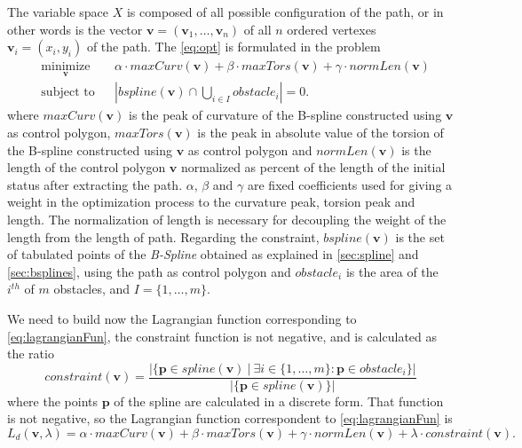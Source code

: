 \documentclass[dissertation.tex]{subfiles}
\begin{document}
The variable space $X$ is composed of all possible
configuration of the path, or in other words is the vector
$\mathbf{v}=(\mathbf{v}_1,\dots,\mathbf{v}_n)$ of all $n$ ordered
vertexes $\mathbf{v}_i=(x_i,y_i)$ of the
path. The \cref{eq:opt} is formulated in the problem
\begin{equation*}
  \begin{aligned}
    & \underset{\mathbf{v}}{\text{minimize}}
    & & \alpha\cdot maxCurv(\mathbf{v})+\beta\cdot
    maxTors(\mathbf{v})+\gamma\cdot normLen(\mathbf{v}) \\
    & \text{subject to}
    & & \left|bspline(\mathbf{v})\cap \bigcup_{i\in I}obstacle_i\right| = 0.
  \end{aligned}
\end{equation*}
where $maxCurv(\mathbf{v})$ is the peak of curvature of the B-spline
constructed using $\mathbf{v}$ as control polygon,
$maxTors(\mathbf{v})$ is the peak in absolute value of the torsion of
the B-spline constructed using $\mathbf{v}$ as control polygon and
$normLen(\mathbf{v})$ is the length of the control polygon
$\mathbf{v}$ normalized as percent of the length of the initial status
after extracting the path. $\alpha$, $\beta$ and $\gamma$ are fixed
coefficients used for giving a weight in the optimization process to
the curvature peak, torsion peak and length. The normalization of
length is necessary for decoupling the weight of the length from the
length of path. Regarding the constraint, $bspline(\mathbf{v})$
is the set of tabulated points of the \emph{B-Spline} obtained as
explained in
\cref{sec:spline} and \cref{sec:bsplines}, using the path as
control polygon and
$obstacle_i$ is the area of the $i^{th}$ of $m$ obstacles, and
$I=\{1,\dots,m\}$.

We need to build now the Lagrangian function corresponding to
\cref{eq:lagrangianFun}, the constraint function is not negative, and is calculated as the
ratio
\begin{equation*}
constraint(\mathbf{v}) = \frac{|\{\mathbf{p} \in spline(\mathbf{v})\ |\ \exists i\in\{1,\dots,m\}
  : \mathbf{p}\in obstacle_i \}|}{|\{\mathbf{p} \in spline(\mathbf{v})\}|}
\end{equation*}
where the points $\mathbf{p}$ of the spline are calculated in a discrete form. That
function is not negative, so the Lagrangian function correspondent to
\cref{eq:lagrangianFun} is
\begin{equation}\label{eq:lagrangianFunProj}
    L_d(\mathbf{v},\lambda)=\alpha\cdot maxCurv(\mathbf{v})+\beta\cdot
    maxTors(\mathbf{v})+\gamma\cdot normLen(\mathbf{v})+\lambda\cdot constraint(\mathbf{v}).
\end{equation}
\end{document}
